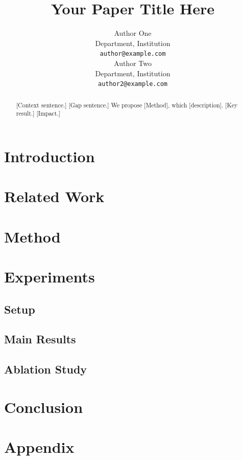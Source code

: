 \documentclass{article}
\title{Your Paper Title Here}
\author{
  Author One \\
  Department, Institution \\
  \texttt{author@example.com} \\
  \And
  Author Two \\
  Department, Institution \\
  \texttt{author2@example.com} \\
}
\begin{document}
\maketitle

\begin{abstract}
  [Context sentence.] [Gap sentence.] We propose [Method], which [description].
  [Key result.] [Impact.]
\end{abstract}

\section{Introduction}
\label{sec:intro}

\section{Related Work}
\label{sec:related}

\section{Method}
\label{sec:method}

\section{Experiments}
\label{sec:experiments}

\subsection{Setup}
\subsection{Main Results}
\subsection{Ablation Study}

\section{Conclusion}
\label{sec:conclusion}




\newpage
\appendix
\section{Appendix}
\end{document}
